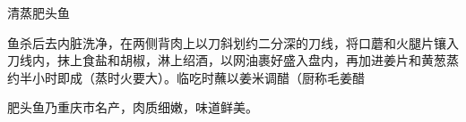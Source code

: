 \begin{recipe}{清蒸肥头鱼}

\ingredients





\cooking

鱼杀后去内脏洗净，在两侧背肉上以刀斜划约二分深的刀线，将口蘑和火腿片镶入刀线内，抹上食盐和胡椒，淋上绍酒，以网油裹好盛入盘内，再加进姜片和黄葱蒸约半小时即成（蒸时火要大）。临吃时蘸以姜米调醋（厨称毛姜醋

\notes

肥头鱼乃重庆市名产，肉质细嫩，味道鲜美。

\end{recipe}

